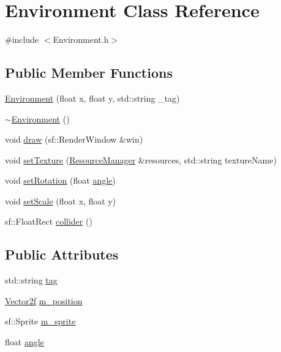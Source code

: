 \hypertarget{class_environment}{}\section{Environment Class Reference}
\label{class_environment}


{\ttfamily \#include $<$Environment.\+h$>$}

\subsection*{Public Member Functions}
\begin{DoxyCompactItemize}
\item 
\mbox{\hyperlink{class_environment_a26ec69a91e421bfe6a12c7f17955fa9b}{Environment}} (float x, float y, std\+::string \+\_\+tag)
\item 
\mbox{\hyperlink{class_environment_a8e294735187880dd3d59be10c425b29d}{$\sim$\+Environment}} ()
\item 
void \mbox{\hyperlink{class_environment_adfbdb91f7ab45252711cb6b0d499a40d}{draw}} (sf\+::\+Render\+Window \&win)
\item 
void \mbox{\hyperlink{class_environment_a55ae46ea23667b1fc4de6bdc0935107e}{set\+Texture}} (\mbox{\hyperlink{class_resource_manager}{Resource\+Manager}} \&resources, std\+::string texture\+Name)
\item 
void \mbox{\hyperlink{class_environment_a4615c9f3ea54f3365edd07c6dd92c612}{set\+Rotation}} (float \mbox{\hyperlink{class_environment_af506dbb19e1fb357a88221c510d4e834}{angle}})
\item 
void \mbox{\hyperlink{class_environment_adf58bfd600005d72d6fdb2c5236440dc}{set\+Scale}} (float x, float y)
\item 
sf\+::\+Float\+Rect \mbox{\hyperlink{class_environment_a991c9538f0da2c606359517f83f3fa28}{collider}} ()
\end{DoxyCompactItemize}
\subsection*{Public Attributes}
\begin{DoxyCompactItemize}
\item 
std\+::string \mbox{\hyperlink{class_environment_a5858053529312140e8d7e8ab8b0f2dc0}{tag}}
\item 
\mbox{\hyperlink{class_vector2f}{Vector2f}} \mbox{\hyperlink{class_environment_ac08b227b88843515dae0938715ddfd1e}{m\+\_\+position}}
\item 
sf\+::\+Sprite \mbox{\hyperlink{class_environment_aea118013b2fe6baf3546bcce8c47bf79}{m\+\_\+sprite}}
\item 
float \mbox{\hyperlink{class_environment_af506dbb19e1fb357a88221c510d4e834}{angle}}
\end{DoxyCompactItemize}



